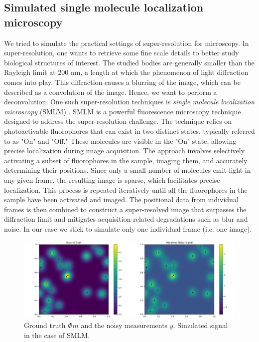 \documentclass[a4paper,12pt,oneside]{report}
\theoremstyle{named}
\begin{document}
\subsection{Simulated single molecule localization microscopy}

We tried to simulate the practical settings of super-resolution for microscopy. In super-resolution, one wants to retrieve some fine scale details to better study biological structures of interest. The studied bodies are generally smaller than the Rayleigh limit at 200 nm, a length at which the phenomenon of light diffraction comes into play. This diffraction causes a blurring of the image, which can be described as a convolution of the image. Hence, we want to perform a deconvolution. One such super-resolution techniques is \textit{single molecule localization microscopy} (SMLM) \cite{Sage2015}.  SMLM is a powerful fluorescence microscopy technique designed to address the super-resolution challenge. The technique relies on photoactivable fluorophores that can exist in two distinct states, typically referred to as "On" and "Off." These molecules are visible in the "On" state, allowing precise localization during image acquisition. The approach involves selectively activating a subset of fluorophores in the sample, imaging them, and accurately determining their positions. Since only a small number of molecules emit light in any given frame, the resulting image is sparse, which facilitates precise localization. This process is repeated iteratively until all the fluorophores in the sample have been activated and imaged. The positional data from individual frames is then combined to construct a super-resolved image that surpasses the diffraction limit and mitigates acquisition-related degradations such as blur and noise. In our case we stick to simulate only one individual frame (i.e. one image). \\

\begin{figure}
\centering
\hspace*{-1.5cm}\includegraphics[width=1.2\linewidth]{gt_2d.png}
\caption{Ground truth $\Phi m$ and the noisy measurements $y$. Simulated signal in the case of SMLM.}
\label{fig:gt_2d}
\end{figure}
\end{document}
